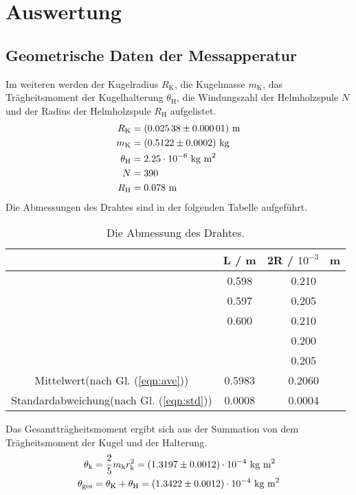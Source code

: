\section{Auswertung}
\label{sec:Auswertung}

\subsection{Geometrische Daten der Messapperatur}
Im weiteren werden der Kugelradius $R_\text{K}$, die Kugelmasse $m_\text{K}$, das Trägheitsmoment der Kugelhalterung $\theta_\text{H}$, die Windungszahl der Helmholzspule $N$ und der Radius der Helmholzspule $R_\text{H}$ aufgelistet.
\begin{align*}
  R_\text{K} &= (\num{0.02538 +- 0.00001}) \ \text{m} \\
  m_\text{K} &= (\num{0.5122 +- 0.0002}) \ \text{kg} \\
  \theta_\text{H} &= 2.25 \cdot 10^{-6} \ \text{kg m}^2 \\
  N &= 390 \\
  R_\text{H} &= 0.078 \ \text{m}
\end{align*}
Die Abmessungen des Drahtes sind in der folgenden Tabelle aufgeführt.

\begin{table}[H] %
  \centering
  \begin{tabular}{c | c | c}
    \toprule
    & L / m & 2R / $10^{-3}$ \ m \\
    \midrule
    & 0.598 & 0.210 \\
    & 0.597 & 0.205 \\
    & 0.600 & 0.210 \\
    &       & 0.200 \\
    &       & 0.205 \\
    \bottomrule
    Mittelwert(nach Gl. (\ref{eqn:ave}))         & 0.5983 & 0.2060 \\
    Standardabweichung(nach Gl. (\ref{eqn:std})) & 0.0008 & 0.0004 \\
    \bottomrule
  \end{tabular}
  \caption{Die Abmessung des Drahtes.}
  \label{tab:Messwerte}
\end{table}

Das Gesamtträgheitsmoment ergibt sich aus der Summation von dem Trägheitsmoment der Kugel und der Halterung.
\begin{align*}
  \theta_\text{k} & = \frac{2}{5} m_\text{k} r^2_\text{k} = (\num{1.3197 +- 0.0012}) \cdot 10^{-4} \ \text{kg m}^2 \\
  \theta_\text{ges} & = \theta_\text{K} + \theta_\text{H} = (\num{1.3422 +- 0.0012}) \cdot 10^{-4} \ \text{kg m}^2
\end{align*}

